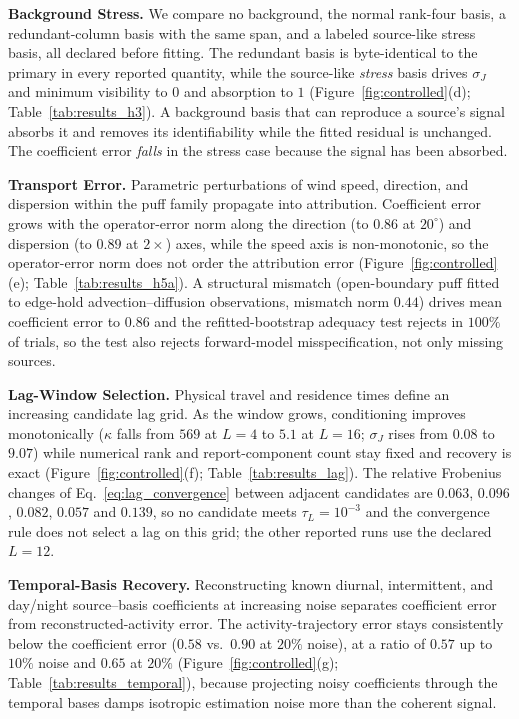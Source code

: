 \noindent\textbf{Background Stress.}
\label{subsec:results_h3}
We compare no background, the normal rank-four basis, a redundant-column basis with
the same span, and a labeled source-like stress basis, all declared before fitting.
The redundant basis is byte-identical to the primary in every reported quantity,
while the source-like \emph{stress} basis drives $\sigma_J$ and minimum visibility
to $0$ and absorption to $1$ (Figure~\ref{fig:controlled}(d);
Table~\ref{tab:results_h3}).  A background basis that can reproduce a source's
signal absorbs it and removes its identifiability while the fitted residual is
unchanged.  The coefficient error \emph{falls} in the stress case because the signal
has been absorbed.

\noindent\textbf{Transport Error.}
Parametric perturbations of wind speed, direction, and dispersion within the puff
family propagate into attribution.  Coefficient error grows with the operator-error
norm along the direction (to $0.86$ at $20^\circ$) and dispersion (to $0.89$ at
$2\times$) axes, while the speed axis is non-monotonic, so the operator-error norm does not order
the attribution error (Figure~\ref{fig:controlled}(e);
Table~\ref{tab:results_h5a}).  A structural mismatch (open-boundary puff fitted to
edge-hold advection--diffusion observations, mismatch norm $0.44$) drives mean
coefficient error to $0.86$ and the refitted-bootstrap adequacy test rejects in
$100\%$ of trials, so the test also rejects forward-model misspecification, not only
missing sources.

\noindent\textbf{Lag-Window Selection.}
Physical travel and residence times define an increasing candidate lag grid.  As the
window grows, conditioning improves monotonically
($\kappa$ falls from $569$ at $L{=}4$ to $5.1$ at $L{=}16$; $\sigma_J$ rises from
$0.08$ to $9.07$) while numerical rank and report-component count stay fixed and
recovery is exact (Figure~\ref{fig:controlled}(f); Table~\ref{tab:results_lag}).
The relative Frobenius changes of Eq.~\ref{eq:lag_convergence} between adjacent
candidates are $0.063$, $0.096$, $0.082$, $0.057$ and $0.139$, so no candidate meets
$\tau_L=10^{-3}$ and the convergence rule does not select a lag on this grid; the
other reported runs use the declared $L=12$.

\noindent\textbf{Temporal-Basis Recovery.}
Reconstructing known diurnal, intermittent, and day/night source--basis
coefficients at increasing noise separates coefficient error from
reconstructed-activity error.  The activity-trajectory error stays consistently below
the coefficient error ($0.58$ vs.\ $0.90$ at $20\%$ noise), at a ratio of $0.57$ up to
$10\%$ noise and $0.65$ at $20\%$ (Figure~\ref{fig:controlled}(g); Table~\ref{tab:results_temporal}),
because projecting noisy coefficients through the temporal bases damps isotropic
estimation noise more than the coherent signal.

